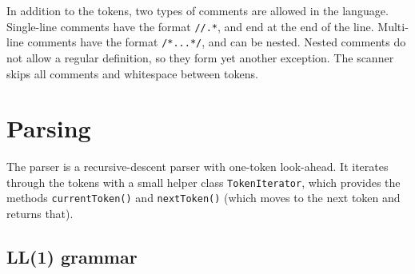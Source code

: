 \documentclass[a4paper]{article}
\newcommand*{\code}[1]{\texttt{#1}}
\begin{document}
In addition to the tokens, two types of comments are allowed in 
the language. Single-line comments have the format \verb_//.*_, 
and end at the end of the line. Multi-line comments have the format
\verb_/*...*/_, and can be nested. Nested comments do not allow 
a regular definition, so they form yet another exception. The 
scanner skips all comments and whitespace between tokens.



\clearpage
\section{Parsing}

The parser is a recursive-descent parser with one-token look-ahead.
It iterates through the tokens with a small helper class 
\code{TokenIterator}, which provides the methods \code{currentToken()} 
and \code{nextToken()} (which moves to the next token and returns that).

\subsection{LL(1) grammar}
\end{document}
